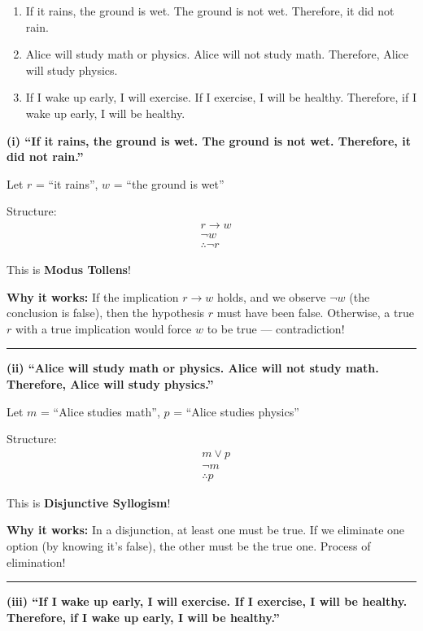 \documentclass[11pt,a4paper]{article}
\begin{document}
\begin{enumerate}[label=(\roman*)]
    \item If it rains, the ground is wet. The ground is not wet. Therefore, it did not rain.
    \item Alice will study math or physics. Alice will not study math. Therefore, Alice will study physics.
    \item If I wake up early, I will exercise. If I exercise, I will be healthy. Therefore, if I wake up early, I will be healthy.
\end{enumerate}

\begin{solnbox}
\textbf{(i) ``If it rains, the ground is wet. The ground is not wet. Therefore, it did not rain.''}

Let $r$ = ``it rains'', $w$ = ``the ground is wet''

Structure:
\begin{align*}
&r \to w \\
&\neg w \\
&\therefore \neg r
\end{align*}

This is \textbf{Modus Tollens}!

\textbf{Why it works:} If the implication $r \to w$ holds, and we observe $\neg w$ (the conclusion is false), then the hypothesis $r$ must have been false. Otherwise, a true $r$ with a true implication would force $w$ to be true --- contradiction!

\rule{\linewidth}{0.3pt}

\textbf{(ii) ``Alice will study math or physics. Alice will not study math. Therefore, Alice will study physics.''}

Let $m$ = ``Alice studies math'', $p$ = ``Alice studies physics''

Structure:
\begin{align*}
&m \lor p \\
&\neg m \\
&\therefore p
\end{align*}

This is \textbf{Disjunctive Syllogism}!

\textbf{Why it works:} In a disjunction, at least one must be true. If we eliminate one option (by knowing it's false), the other must be the true one. Process of elimination!

\rule{\linewidth}{0.3pt}

\textbf{(iii) ``If I wake up early, I will exercise. If I exercise, I will be healthy. Therefore, if I wake up early, I will be healthy.''}


\end{solnbox}
\end{document}
